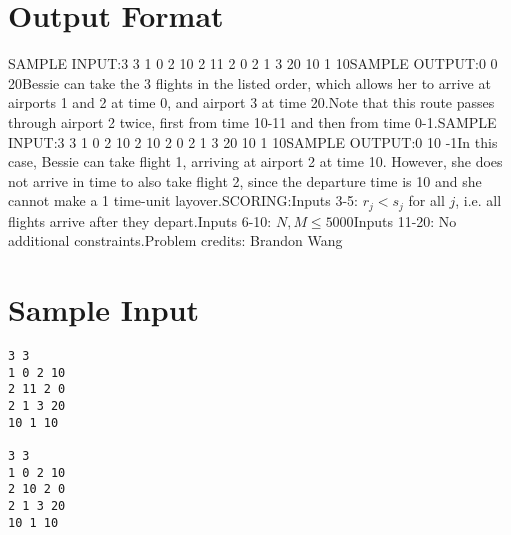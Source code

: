 \documentclass[12pt]{article}
\begin{document}
\section*{Output Format}
SAMPLE INPUT:3 3
1 0 2 10
2 11 2 0
2 1 3 20
10 1 10SAMPLE OUTPUT:0
0
20Bessie can take the 3 flights in the listed order, which allows her to arrive at
airports  1 and 2 at time 0, and airport 3 at time 20.Note that this route passes through airport 2 twice, first from time 10-11 and
then from time 0-1.SAMPLE INPUT:3 3
1 0 2 10
2 10 2 0
2 1 3 20
10 1 10SAMPLE OUTPUT:0
10
-1In this case, Bessie can take flight 1, arriving at airport 2 at time 10.
However, she does not arrive in time to also take flight 2, since the departure
time is 10 and she cannot make a 1 time-unit layover.SCORING:Inputs 3-5: $r_j < s_j$ for all $j$, i.e. all flights arrive after they
depart.Inputs 6-10: $N, M \leq 5000$Inputs 11-20: No additional constraints.Problem credits: Brandon Wang

\section*{Sample Input}
\begin{verbatim}
3 3
1 0 2 10
2 11 2 0
2 1 3 20
10 1 10

3 3
1 0 2 10
2 10 2 0
2 1 3 20
10 1 10
\end{verbatim}
\end{document}
